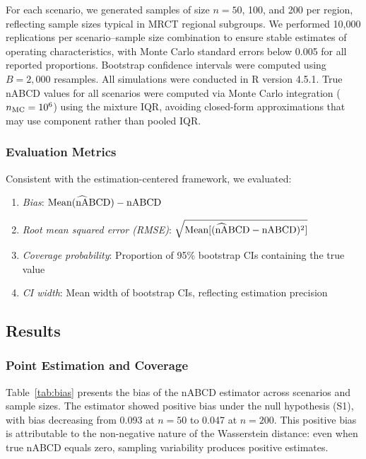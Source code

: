 \documentclass[AMA,Times1COL]{WileyNJDv5}
\newcommand{\hnABCD}{\mathrlap{\widehat{\phantom{\text{nA}}}}\text{nABCD}}
\begin{document}
For each scenario, we generated samples of size $n = 50$, 100, and 200 per region, reflecting sample sizes typical in MRCT regional subgroups. We performed 10{,}000 replications per scenario--sample size combination to ensure stable estimates of operating characteristics, with Monte Carlo standard errors below 0.005 for all reported proportions. Bootstrap confidence intervals were computed using $B = 2{,}000$ resamples. All simulations were conducted in R version 4.5.1. True nABCD values for all scenarios were computed via Monte Carlo integration ($n_{\textup{MC}} = 10^6$) using the mixture IQR, avoiding closed-form approximations that may use component rather than pooled IQR.

\subsubsection{Evaluation Metrics}

Consistent with the estimation-centered framework, we evaluated:
\begin{enumerate}[1.]
\item \emph{Bias}: $\text{Mean}(\hnABCD) - \text{nABCD}$
\item \emph{Root mean squared error (RMSE)}: $\sqrt{\text{Mean}[(\hnABCD - \text{nABCD})^2]}$
\item \emph{Coverage probability}: Proportion of 95\% bootstrap CIs containing the true value
\item \emph{CI width}: Mean width of bootstrap CIs, reflecting estimation precision
\end{enumerate}

\subsection{Results}\label{sec:sim_results}

\subsubsection{Point Estimation and Coverage}

Table~\ref{tab:bias} presents the bias of the nABCD estimator across scenarios and sample sizes. The estimator showed positive bias under the null hypothesis (S1), with bias decreasing from 0.093 at $n=50$ to 0.047 at $n=200$. This positive bias is attributable to the non-negative nature of the Wasserstein distance: even when true nABCD equals zero, sampling variability produces positive estimates.
\end{document}
